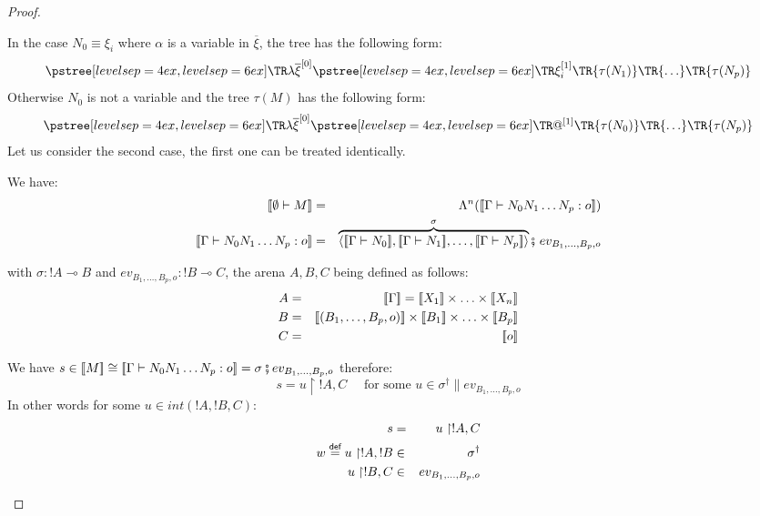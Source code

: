 \begin{proof}
\begin{itemize}
    In the case $N_0 \equiv \xi_i$ where $\alpha$ is a variable in $\overline{\xi}$, the tree has the following form:
    $$ \tree[levelsep=6ex]{\lambda \overline{\xi}^{[0]}}
        { \tree[levelsep=6ex]{\xi_i^{[1]}}
            {   \TR{\tau(N_1)} \TR{\ldots} \TR{\tau(N_p)}}}
    $$
    Otherwise $N_0$ is not a variable and the tree $\tau(M)$ has the following form:
    $$ \tree[levelsep=6ex]{\lambda \overline{\xi}^{[0]}}
        { \tree[levelsep=6ex]{@^{[1]}}
            {   \TR{\tau(N_0)} \TR{\ldots} \TR{\tau(N_p)}}}
    $$
    Let us consider the second case, the first one can
    be treated identically.

    We have:
    \begin{eqnarray*}
    \sem{ \emptyset \vdash M} &=& \Lambda^n( \sem{\Gamma \vdash N_0 N_1 \ldots N_p : o} ) \\
    \sem{\Gamma \vdash N_0  N_1 \ldots N_p : o} &=& \overbrace{\langle \sem{\Gamma \vdash N_0}, \sem{\Gamma \vdash N_1}, \ldots, \sem{\Gamma \vdash N_p} \rangle}^\sigma \fatsemi\ ev_{B_1,\ldots,B_p,o}
    \end{eqnarray*}

    with $\sigma : !A \multimap B$ and $ev_{B_1,\ldots,B_p,o} : !B \multimap C$, the arena $A,B,C$ being defined as follows:
    \begin{eqnarray*}
        A &=& \sem{\Gamma} = \sem{X_1} \times \ldots \times \sem{X_n}\\
        B &=& \sem{(B_1,\ldots,B_p,o)} \times \sem{B_1} \times \ldots \times \sem{B_p} \\
        C &=& \sem{o}
    \end{eqnarray*}




    We have $s \in {[\![M ]\!]} \cong {[\![\Gamma \vdash N_0 N_1 \ldots N_p : o ]\!]} = \sigma \fatsemi ev_{B_1,\ldots,B_p,o}$ therefore:
    \begin{equation}
        s = u \upharpoonright !A, C   \quad \mbox{ for some } u \in \sigma^{\dag} \parallel ev_{B_1,\ldots,B_p,o}
    \end{equation}
    In other words for some $u \in int(!A,!B,C)$:
    \begin{eqnarray}
        s &=& u \upharpoonright !A, C    \label{eq:def_s} \\
        w \stackrel{\textsf{def}}{=} u \upharpoonright !A,!B & \in& \sigma^\dagger       \label{eq:def_w}\\
        u \upharpoonright !B,C & \in & ev_{B_1,\ldots,B_p,o} \nonumber
    \end{eqnarray}


\end{itemize}
\end{proof}
